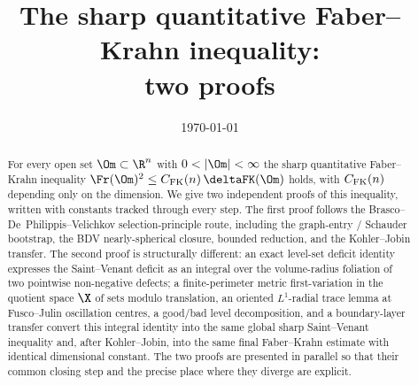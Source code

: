 \documentclass[11pt,a4paper]{amsart}
\title{The sharp quantitative Faber--Krahn inequality:\\
two proofs}
\author{}
\date{\today}
\theoremstyle{plain}
\theoremstyle{definition}
\theoremstyle{remark}
\begin{document}
\begin{abstract}
For every open set $\Om\subset\R^n$ with $0<|\Om|<\infty$ the
sharp quantitative Faber--Krahn inequality
$\Fr(\Om)^2\le C_{\rm FK}(n)\,\deltaFK(\Om)$ holds, with
$C_{\rm FK}(n)$ depending only on the dimension. We give two
independent proofs of this inequality, written with constants tracked
through every step. The first proof follows the
Brasco--De~Philippis--Velichkov selection-principle route, including
the graph-entry / Schauder bootstrap, the BDV nearly-spherical
closure, bounded reduction, and the Kohler--Jobin transfer. The
second proof is structurally different: an exact level-set deficit
identity expresses the Saint--Venant deficit as an integral over the
volume-radius foliation of two pointwise non-negative defects; a
finite-perimeter metric first-variation in the quotient space $\X$
of sets modulo translation, an oriented $L^1$-radial trace lemma at
Fusco--Julin oscillation centres, a good/bad level decomposition,
and a boundary-layer transfer convert this integral identity into the
same global sharp Saint--Venant inequality and, after Kohler--Jobin,
into the same final Faber--Krahn estimate with identical dimensional
constant. The two proofs are presented in parallel so that their
common closing step and the precise place where they diverge are
explicit.
\end{abstract}

\maketitle











\label{sec:references}
\end{document}
